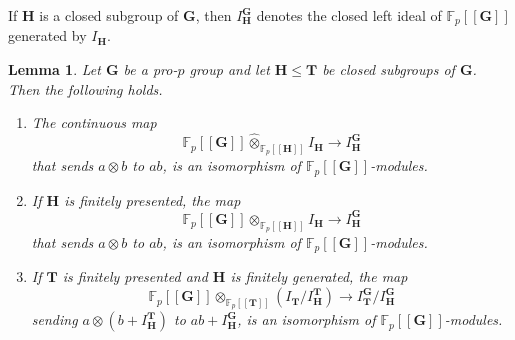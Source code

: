 \documentclass[11pt]{amsart}
\newtheorem{lem}{Lemma}[section]
\numberwithin{claimcounter}{lem}
\newcommand{\F}{\mathbb{F}}
\begin{document}
If $\mathbf H$ is a closed subgroup of $\mathbf G$, then $I_\mathbf H^\mathbf G$ denotes the closed left ideal of $\F_p[[\mathbf G]]$ generated by $I_\mathbf H$. 

\begin{lem} \label{usisom} Let $\mathbf G$ be a pro-$p$ group and let $\mathbf H\le \mathbf T$ be   closed subgroups of $\mathbf G$. Then the following holds.
\begin{enumerate}
\item [(a)] The   continuous map $$\displaystyle \F_p[[\mathbf G]]\widehat \otimes_{\F_p[[\mathbf H]]} I_\mathbf H\to I_\mathbf H^\mathbf G$$ that sends $a\otimes b$ to $ab$, is an isomorphism of $\F_p[[\mathbf G]]$-modules.

\item [(b)] If $\mathbf H$ is finitely presented, the  map $$\displaystyle \F_p[[\mathbf G]]\otimes_{\F_p[[\mathbf H]]} I_\mathbf H\to I_\mathbf H^\mathbf G$$ that sends $a\otimes b$ to $ab$, is an isomorphism of $\F_p[[\mathbf G]]$-modules.
\item [(c)] If $\mathbf T$ is finitely presented and $\mathbf H$ is finitely generated, the   map $$\displaystyle \F_p[[\mathbf G]]\otimes_{\F_p[[\mathbf T]]} (I_\mathbf T/I_\mathbf H^\mathbf T) \to  I_\mathbf T^\mathbf G/I_\mathbf H^\mathbf G$$
  sending $a\otimes (b+I_\mathbf H^\mathbf T)$ to $ab+I_\mathbf H^\mathbf G$,  is an isomorphism of $\F_p[[\mathbf G]]$-modules.


\end{enumerate}

\end{lem}
\end{document}
